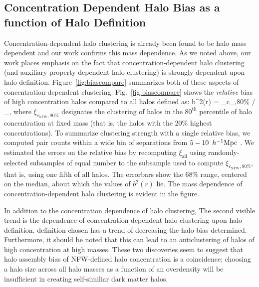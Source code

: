 \documentclass[usenatbib,fleqn]{mnras}
\begin{document}
\subsection{Concentration Dependent Halo Bias as a function of Halo Definition}

Concentration-dependent halo clustering is already been found to be halo mass dependent and our work confirms this mass dependence. As we noted above, our work places emphasis on the fact that concentration-dependent halo clustering (and auxiliary property dependent halo clustering) is strongly dependent upon halo definition. Figure~\ref{fig:biascompare} summarizes both of these aspects of concentration-dependent clustering. Fig.~\ref{fig:biascompare} shows the {\em relative} bias of high concentration halos compared to all halos defined as: 
\beq
b^2(r) = \xi_{c_,80\%} / \xi_{},
\eeq
where $\xi_{c_\mathrm{NFW},80\%}$ designates the clustering of halos in the $80^{\mathrm{th}}$ percentile of halo concentration at fixed mass (that is, the halos with the $20\%$ highest concentrations). To summarize clustering 
strength with a single relative bias, we computed pair counts within a wide bin of separations from $5-10\, \ h^{-1}\mathrm{Mpc}~$. We estimated the errors on the relative bias by recomputing $\xi_{\mathrm{all}}$ using randomly-selected subsamples of equal number to the subsample used to compute $\xi_{c_{\mathrm{NFW}},80\%}$, that is, using one fifth of all halos. 
The errorbars show the $68\%$ range, centered on the median, about which the values of $b^2(r)$ lie. The mass dependence of concentration-dependent halo clustering is evident in the figure. 

In addition to the concentration dependence of halo clustering, The second visible trend is the dependence of concentration dependent halo clustering upon halo definition. 
definition chosen has a trend of decreasing the halo bias determined. Furthermore, it should be noted that this
can lead to an anticlustering of halos of high concentration at high masses. These two discoveries seem to
suggest that halo assembly bias of NFW-defined halo concentration is a coincidence; choosing a halo size
across all halo masses as a function of an overdensity will be insufficient in creating self-similiar dark
matter halos.
\end{document}
